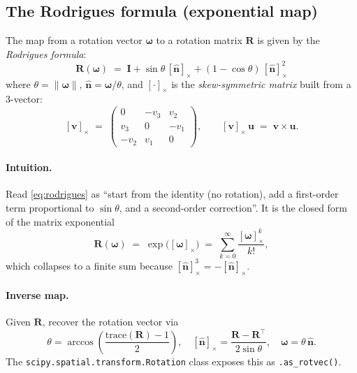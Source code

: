\documentclass[11pt]{article}
\newcommand{\norm}[1]{\left\lVert #1 \right\rVert}
\newcommand{\skewmat}[1]{\left[ #1 \right]_{\times}}
\begin{document}
\subsection{The Rodrigues formula (exponential map)}

The map from a rotation vector $\boldsymbol{\omega}$ to a rotation matrix
$\mathbf{R}$ is given by the \emph{Rodrigues formula}:
\begin{equation}
  \boxed{\quad
    \mathbf{R}(\boldsymbol{\omega}) \;=\; \mathbf{I}
      + \sin\theta\,\skewmat{\hat{\mathbf{n}}}
      + (1 - \cos\theta)\,\skewmat{\hat{\mathbf{n}}}^2
  \quad}
  \label{eq:rodrigues}
\end{equation}
where $\theta = \norm{\boldsymbol{\omega}}$, $\hat{\mathbf{n}} = \boldsymbol{\omega}/\theta$, and
$\skewmat{\cdot}$ is the \emph{skew-symmetric matrix} built from a 3-vector:
\begin{equation}
  \skewmat{\mathbf{v}} \;=\;
  \begin{pmatrix}
    0 & -v_3 & v_2 \\
    v_3 & 0 & -v_1 \\
    -v_2 & v_1 & 0
  \end{pmatrix},
  \qquad
  \skewmat{\mathbf{v}}\,\mathbf{u} \;=\; \mathbf{v} \times \mathbf{u}.
\end{equation}

\paragraph{Intuition.} Read \eqref{eq:rodrigues} as ``start from the
identity (no rotation), add a first-order term proportional to
$\sin\theta$, and a second-order correction''. It is the closed form of the
matrix exponential
\[
  \mathbf{R}(\boldsymbol{\omega}) \;=\; \exp\!\big(\skewmat{\boldsymbol{\omega}}\big)
  \;=\; \sum_{k=0}^{\infty} \frac{\skewmat{\boldsymbol{\omega}}^k}{k!},
\]
which collapses to a finite sum because $\skewmat{\hat{\mathbf{n}}}^3 = -\skewmat{\hat{\mathbf{n}}}$.

\paragraph{Inverse map.} Given $\mathbf{R}$, recover the rotation vector via
\begin{equation}
  \theta = \arccos\!\left(\frac{\mathrm{trace}(\mathbf{R}) - 1}{2}\right),
  \quad
  \skewmat{\hat{\mathbf{n}}} = \frac{\mathbf{R} - \mathbf{R}^\top}{2\sin\theta},
  \quad
  \boldsymbol{\omega} = \theta\,\hat{\mathbf{n}}.
\end{equation}
The \texttt{scipy.spatial.transform.Rotation} class exposes this as
\verb|.as_rotvec()|.
\end{document}

